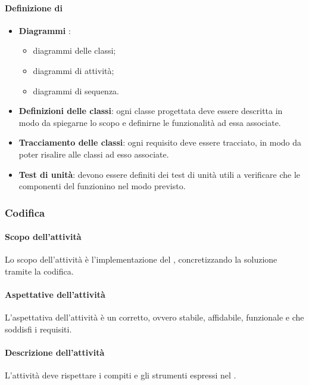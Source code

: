  \paragraph{Definizione di }
 \begin{itemize}
 	\item \textbf{Diagrammi }:
 	\begin{itemize}
 		\item diagrammi delle classi;
 		\item diagrammi di attività;
 		\item diagrammi di sequenza.
 	\end{itemize}
 	\item \textbf{Definizioni delle classi}: ogni classe progettata deve essere descritta in modo da spiegarne lo scopo e definirne le
 	funzionalità ad essa associate.
 	\item \textbf{Tracciamento delle classi}: ogni requisito deve essere tracciato, in modo da poter risalire alle classi ad esso associate. 
 	\item \textbf{Test di unità}: devono essere definiti dei test di unità utili a verificare che le componenti del  funzionino nel modo previsto.
 \end{itemize}
 
 
 \subsubsection{Codifica}
 \paragraph{Scopo dell'attività}
 Lo scopo dell'attività è l'implementazione del , concretizzando la soluzione tramite la codifica.  
 \paragraph{Aspettative dell'attività}
 L'aspettativa dell'attività è un  corretto, ovvero stabile, affidabile, funzionale e che soddisfi i requisiti. 
 \paragraph{Descrizione dell'attività}
 L'attività deve rispettare i compiti e gli strumenti espressi nel \PPdocRP.
